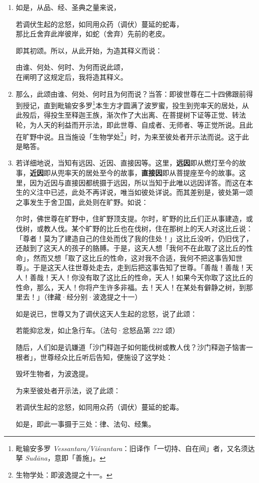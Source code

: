 \begin{enumerate}\item 如是，从品、经、圣典之量来说，\begin{quoting}若调伏生起的忿怒，如同用众药（调伏）蔓延的蛇毒，\\那比丘舍弃此岸彼岸，如蛇（舍弃）先前的老皮。\end{quoting}即其初颂。所以，从此开始，为造其释义而说：\begin{quoting}由谁、何处、何时、为何而说此颂，\\在阐明了这规定后，我将造其释义。\end{quoting}
\item 那么，此颂由谁、何处、何时且为何而说？当答：即彼世尊在二十四佛跟前得到授记，直到毗输安多罗\footnote{毗输安多罗 \textit{Vessantara/Viśvantara}：旧译作「一切持、自在间」者，又名须达拏 \textit{Sudāna}，意即「善施」。}本生方才圆满了波罗蜜，投生到兜率天的居处，从此殁后，得投生至释迦王族，渐次作了大出离、在菩提树下证等正觉、转法轮，为人天的利益而开示法，即此世尊、自成者、无师者、等正觉所说。且此在旷野中说。且当施设「生物学处\footnote{生物学处：即波逸提之十一。}」时，为来至彼处者开示法而说。这于此是略答。
\item 若详细地说，当知有远因、近因、直接因等。这里，\textbf{远因}即从燃灯至今的故事，\textbf{近因}即从兜率天的居处至今的故事，\textbf{直接因}即从菩提座至今的故事。这里，因为近因与直接因都统摄于远因，所以当知于此唯以远因详答。而这在本生的义注中已述，此处不再详说，唯当如彼处详说。而其差别是，彼处第一颂之事发生于舍卫国，此处则在旷野。如说：\begin{quoting}尔时，佛世尊在旷野中，住旷野顶支提。尔时，旷野的比丘们正从事建造，或伐树，或教人伐。某个旷野的比丘也在伐树，住在那树上的天人对这比丘说：「尊者！莫为了建造自己的住处而伐了我的住处！」这比丘没听，仍旧伐了，还敲到了这天人的孩子的胳膊。于是，这天人想「我何不在此取了这比丘的性命」，然而又想「取了这比丘的性命，这对我不合适，我何不把这事告知世尊」。于是这天人往世尊处走去，走到后把这事告知了世尊。「善哉！善哉！天人！善哉！天人！你没有取了这比丘的性命，天人！如果今天你取了这比丘的性命，那么，天人！你将产生许多非福。去！天人！在某处有僻静之树，到那里去！」（律藏·经分别·波逸提之十一）\end{quoting}如是说已，世尊又为了调伏这天人生起的忿怒，说了此颂：\begin{quoting}若能抑忿发，如止急行车。（法句·忿怒品第 222 颂）\end{quoting}随后，人们如是讥嫌道「沙门释迦子如何能伐树或教人伐？沙门释迦子恼害一根者」，世尊经众比丘听后告知，便施设了这学处：\begin{quoting}毁坏生物者，为波逸提。\end{quoting}为来至彼处者开示法，说了此颂：\begin{quoting}若调伏生起的忿怒，如同用众药（调伏）蔓延的蛇毒。\end{quoting}如是，即此一事摄于三处：律、法句、经集。

\end{enumerate}
